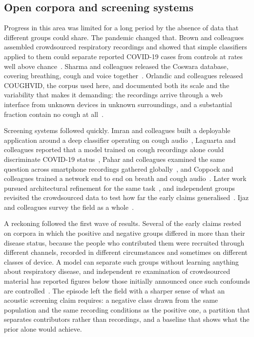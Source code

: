 \documentclass[pdflatex,sn-mathphys-num]{sn-jnl}
\begin{document}
\subsection{Open corpora and screening systems}\label{sec:rel-corpora}

Progress in this area was limited for a long period by the absence of data
that different groups could share. The pandemic changed that. Brown and
colleagues assembled crowdsourced respiratory recordings and showed that
simple classifiers applied to them could separate reported COVID-19 cases from
controls at rates well above chance~\cite{brown2020}. Sharma and colleagues
released the Coswara database, covering breathing, cough and voice
together~\cite{sharma2020}. Orlandic and colleagues released COUGHVID, the
corpus used here, and documented both its scale and the variability that makes
it demanding: the recordings arrive through a web interface from unknown
devices in unknown surroundings, and a substantial fraction contain no cough at
all~\cite{orlandic2021}.

Screening systems followed quickly. Imran and colleagues built a deployable
application around a deep classifier operating on cough
audio~\cite{imran2020}, Laguarta and colleagues reported that a model trained
on cough recordings alone could discriminate COVID-19 status~\cite{laguarta2020},
Pahar and colleagues examined the same question across smartphone recordings
gathered globally~\cite{pahar2021}, and Coppock and colleagues trained a
network end to end on breath and cough audio~\cite{coppock2021}. Later work
pursued architectural refinement for the same task~\cite{dentamaro2022,
vijayakumar2021, lella2021}, and independent groups revisited the crowdsourced
data to test how far the early claims
generalised~\cite{son2022}. Ijaz and colleagues survey the field as a
whole~\cite{ijaz2022}.

A reckoning followed the first wave of results. Several of the early claims
rested on corpora in which the positive and negative groups differed in more
than their disease status, because the people who contributed them were
recruited through different channels, recorded in different circumstances and
sometimes on different classes of device. A model can separate such groups
without learning anything about respiratory disease, and independent
re examination of crowdsourced material has reported figures below those
initially announced once such confounds are controlled~\cite{son2022}. The
episode left the field with a sharper sense of what an acoustic screening
claim requires: a negative class drawn from the same population and the same
recording conditions as the positive one, a partition that separates
contributors rather than recordings, and a baseline that shows what the
prior alone would achieve.
\end{document}
